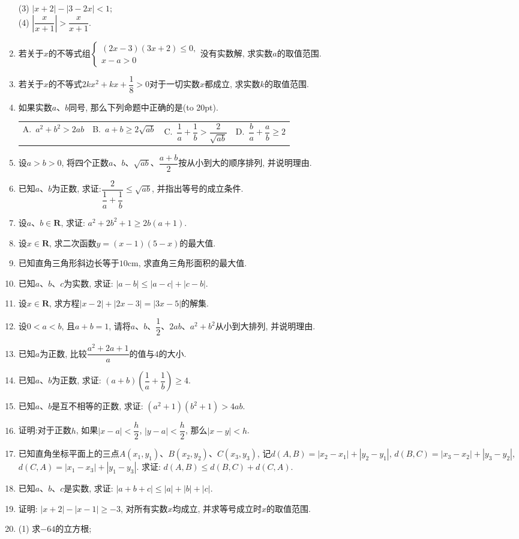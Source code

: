 \documentclass[10pt,a4paper]{article}
\newcommand{\bracket}[1]{(\hbox to #1pt{})}
\newcommand{\fourch}[4]{\par\begin{tabular}{p{.23\textwidth}p{.23\textwidth}p{.23\textwidth}p{.23\textwidth}}
A.~#1 &B.~#2& C.~#3& D.~#4
\end{tabular}}
\begin{document}
\begin{enumerate}[1.]
(3) $|x+2|-|3-2x| <1$;\\
(4) $|\dfrac x{x+1}| > \dfrac x{x+1}$.
\item 若关于$x$的不等式组$\begin{cases} (2x-3)(3x+2)\le 0, \\  x-a>0 \end{cases}$没有实数解, 求实数$a$的取值范围.
\item 若关于$x$的不等式$2kx^2+kx+\dfrac 18>0$对于一切实数$x$都成立, 求实数$k$的取值范围. 
\item 如果实数$a$、$b$同号, 那么下列命题中正确的是\bracket{20}.
\fourch{$a^2+b^2>2ab$}{$a+b\ge 2\sqrt {ab}$}{$\dfrac 1a+\dfrac 1b> \dfrac 2{\sqrt {ab}}$}{$\dfrac ba+\dfrac ab\ge 2$}
\item 设$a>b>0$, 将四个正数$a$、$b$、$\sqrt {ab}$、$\dfrac{a+b}2$按从小到大的顺序排列, 并说明理由.
\item 已知$a$、$b$为正数, 求证:$\dfrac 2{\dfrac 1a+\dfrac 1b}
\le \sqrt {ab}$, 并指出等号的成立条件.
\item 设$a$、$b\in \mathbf{R}$, 求证: $a^2+2b^2+1\ge 2b(a+1)$.
\item 设$x\in \mathbf{R}$, 求二次函数$y=(x-1)(5-x)$的最大值.
\item 已知直角三角形斜边长等于$10\text{cm}$, 求直角三角形面积的最大值.
\item 已知$a$、$b$、$c$为实数, 求证: $|a-b| \le |a-c| +|c-b|$.
\item 设$x\in \mathbf{R}$, 求方程$|x-2|+|2x-3|=|3x-5|$的解集.
\item 设$0<a<b$, 且$a+b=1$, 请将$a$、$b$、$\dfrac 12$、$2ab$、$a^2+b^2$从小到大排列, 并说明理由.
\item 已知$a$为正数, 比较$\dfrac{a^2+2a+1}a$的值与$4$的大小.
\item 已知$a$、$b$为正数, 求证: $(a+b)(\dfrac 1a+\dfrac 1b)\ge 4$.
\item 已知$a$、$b$是互不相等的正数, 求证: $(a^2+1)(b^2+1)>4ab$.
\item 证明:对于正数$h$, 如果$|x-a| <\dfrac h2$, $|y-a| <\dfrac h2$, 那么$|x-y| <h$.
\item 已知直角坐标平面上的三点$A(x_1, y_1)$、$B(x_2, y_2)$、$C(x_3, y_3)$, 记$d(A, B)=|x_2-x_1| +|y_2-y_1|$, $d(B, C)=|x_3-x_2| +|y_3-y_2|$, $d(C, A)=|x_1-x_3| +|y_1-y_3|$. 求证: $d(A, B)\le d(B, C)+d(C, A)$.
\item 已知$a$、$b$、$c$是实数, 求证: $|a+b+c| \le |a|+|b|+|c|$.
\item 证明: $|x+2|-|x-1|\ge -3$, 对所有实数$x$均成立, 并求等号成立时$x$的取值范围. 
\item (1) 求$-64$的立方根;\\

\end{enumerate}
\end{document}

